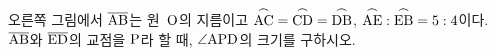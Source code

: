 \noindent\begin{minipage}[t]{0.58\linewidth}\vspace{0pt}\raggedright 오른쪽 그림에서 $\overline{\mathrm{AB}}$는 원~$\mathrm{O}$의 지름이고 $\overset{\frown}{\mathrm{AC}}=\overset{\frown}{\mathrm{CD}}=\overset{\frown}{\mathrm{DB}}$, $\overset{\frown}{\mathrm{AE}}:\overset{\frown}{\mathrm{EB}}=5:4$이다. $\overline{\mathrm{AB}}$와 $\overline{\mathrm{ED}}$의 교점을 $\mathrm{P}$라 할 때, $\angle\mathrm{APD}$의 크기를 구하시오.\end{minipage}\hfill\begin{minipage}[t]{0.4\linewidth}\vspace{0pt}\centering \resizebox{\ifdim\width>\linewidth\linewidth\else\width\fi}{!}{}\end{minipage}\par
